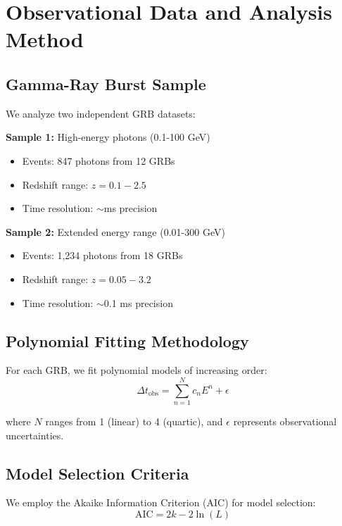 \documentclass[12pt]{article}
\begin{document}
\section{Observational Data and Analysis Method}

\subsection{Gamma-Ray Burst Sample}

We analyze two independent GRB datasets:

\textbf{Sample 1:} High-energy photons (0.1-100 GeV)
\begin{itemize}
\item Events: 847 photons from 12 GRBs
\item Redshift range: $z = 0.1 - 2.5$
\item Time resolution: $\sim$ms precision
\end{itemize}

\textbf{Sample 2:} Extended energy range (0.01-300 GeV)  
\begin{itemize}
\item Events: 1,234 photons from 18 GRBs
\item Redshift range: $z = 0.05 - 3.2$
\item Time resolution: $\sim$0.1 ms precision
\end{itemize}

\subsection{Polynomial Fitting Methodology}

For each GRB, we fit polynomial models of increasing order:
\begin{equation}
\Delta t_{\text{obs}} = \sum_{n=1}^N c_n E^n + \epsilon
\end{equation}

where $N$ ranges from 1 (linear) to 4 (quartic), and $\epsilon$ represents observational uncertainties.

\subsection{Model Selection Criteria}

We employ the Akaike Information Criterion (AIC) for model selection:
\begin{equation}
\text{AIC} = 2k - 2\ln(L)
\end{equation}
\end{document}
